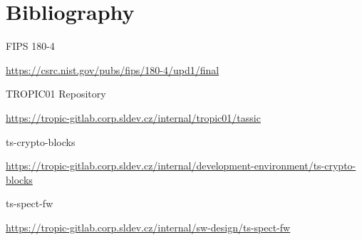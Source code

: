 \documentclass{tropic_design_spec}
\begin{document}

\newpage

\section*{Bibliography}

\begin{thebibliography}{9}

{FIPS 180-4}

\url{https://csrc.nist.gov/pubs/fips/180-4/upd1/final}

{TROPIC01 Repository}

\url{https://tropic-gitlab.corp.sldev.cz/internal/tropic01/tassic}

{ts-crypto-blocks}

\url{https://tropic-gitlab.corp.sldev.cz/internal/development-environment/ts-crypto-blocks}

{ts-spect-fw}

\url{https://tropic-gitlab.corp.sldev.cz/internal/sw-design/ts-spect-fw}


\end{thebibliography}



\pagebreak
\tableofcontents


\end{document}
